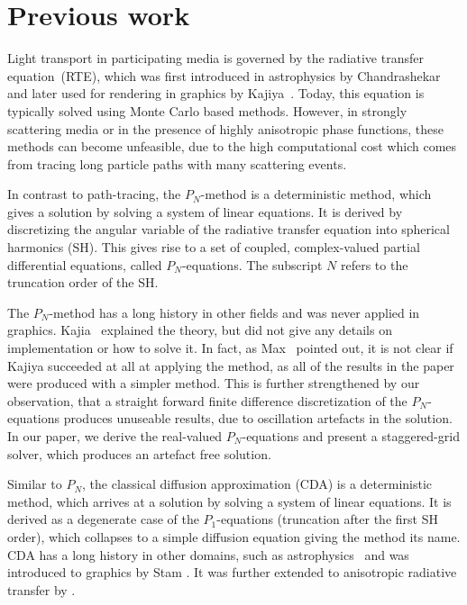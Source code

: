 

\section{Previous work}

Light transport in participating media is governed by the radiative transfer equation~(RTE), which was first introduced in astrophysics by Chandrashekar~\cite{Chandrasekhar60} and later used for rendering in graphics by Kajiya~\cite{Kajiya86}. Today, this equation is typically solved using Monte Carlo based methods. However, in strongly scattering media or in the presence of highly anisotropic phase functions, these methods can become unfeasible, due to the high computational cost which comes from tracing long particle paths with many scattering events.

In contrast to path-tracing, the $P_N$-method is a deterministic method, which gives a solution by solving a system of linear equations. It is derived by discretizing the angular variable of the radiative transfer equation into spherical harmonics (SH). This gives rise to a set of coupled, complex-valued partial differential equations, called $P_N$-equations. The subscript $N$ refers to the truncation order of the SH. 

The $P_N$-method has a long history in other fields and was never applied in graphics. Kajia~\cite{Kajiya84} explained the theory, but did not give any details on implementation or how to solve it. In fact, as Max~\cite{Max95} pointed out, it is not clear if Kajiya succeeded at all at applying the method, as all of the results in the paper were produced with a simpler method. This is further strengthened by our observation, that a straight forward finite difference discretization of the $P_N$-equations produces unuseable results, due to oscillation artefacts in the solution. In our paper, we derive the real-valued $P_N$-equations and present a staggered-grid solver, which produces an artefact free solution.

Similar to $P_N$, the classical diffusion approximation (CDA) is a deterministic method, which arrives at a solution by solving a system of linear equations. It is derived as a degenerate case of the $P_1$-equations (truncation after the first SH order), which collapses to a simple diffusion equation giving the method its name. CDA has a long history in other domains, such as astrophysics~\cite{Ishimaru78} and was introduced to graphics by Stam \cite{Stam95}. It was further extended to anisotropic radiative transfer by \cite{Jakob10}.

